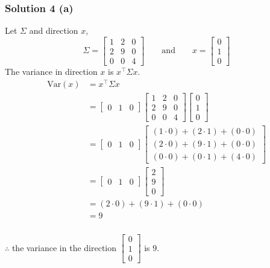 \documentclass{article}
\begin{document}
\subsubsection*{Solution 4 (a)}
Let $\Sigma$ and direction $x$,
\[
\Sigma = \begin{bmatrix}
1 & 2 & 0 \\
2 & 9 & 0 \\
0 & 0 & 4
\end{bmatrix}
\qquad\text{and}\qquad
x = \begin{bmatrix}0 \\ 1 \\ 0\end{bmatrix}
\]
The variance in direction $x$ is $x^\top \Sigma x$.
\begin{align*}
\mathrm{Var}(x)
&= x^\top \Sigma x \\
&= \begin{bmatrix}0 & 1 & 0\end{bmatrix}
\begin{bmatrix}
1 & 2 & 0 \\
2 & 9 & 0 \\
0 & 0 & 4
\end{bmatrix}
\begin{bmatrix}0 \\ 1 \\ 0\end{bmatrix} \\
&= \begin{bmatrix}0 & 1 & 0\end{bmatrix}
\begin{bmatrix}
(1\cdot0) + (2\cdot1) + (0\cdot0) \\
(2\cdot0) + (9\cdot1) + (0\cdot0) \\
(0\cdot0) + (0\cdot1) + (4\cdot0)
\end{bmatrix} \\
&= \begin{bmatrix}0 & 1 & 0\end{bmatrix}
\begin{bmatrix}2 \\ 9 \\ 0\end{bmatrix}\\
&= (2\cdot0) + (9\cdot1) + (0\cdot0) \\
&= 9
\end{align*}
\subsubsection*{\normalfont}{$\therefore$ the variance in the direction $\begin{bmatrix}0 \\ 1 \\ 0\end{bmatrix}$ is $9$.}\\
\end{document}
